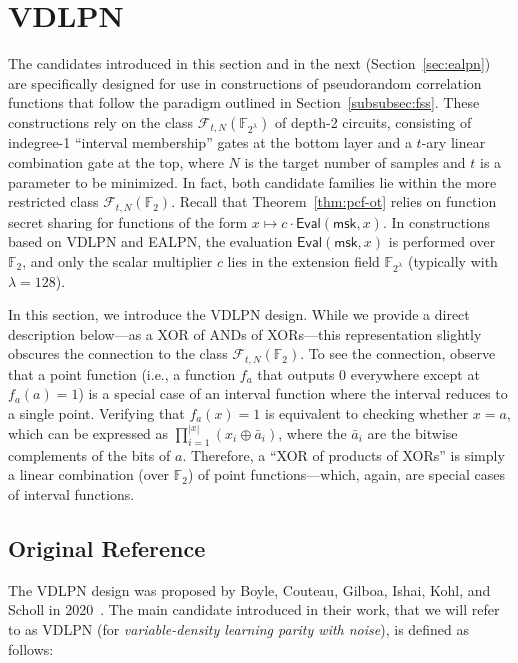\documentclass[journal=tosc,submission]{iacrtrans}
\theoremstyle{theorem}
\newcommand\setF{\ensuremath{\mathcal{F}}\xspace}
\renewcommand\secpar{\ensuremath{\lambda}\xspace}
\newcommand\msk{\ensuremath{\mathsf{msk}}\xspace}
\newcommand\Eval{\ensuremath{\mathsf{Eval}}\xspace}
\newcommand\F{\mathbb{F}}
\begin{document}
\section{VDLPN}
\label{sec:vdlpn}

The candidates introduced in this section and in the next (Section~\ref{sec:ealpn}) are specifically designed for use in constructions of pseudorandom correlation functions that follow the paradigm outlined in Section~\ref{subsubsec:fss}. These constructions rely on the class $\setF_{t,N}(\F_{2^\secpar})$ of depth-2 circuits, consisting of indegree-1 ``interval membership'' gates at the bottom layer and a $t$-ary linear combination gate at the top, where $N$ is the target number of samples and $t$ is a parameter to be minimized. In fact, both candidate families lie within the more restricted class $\setF_{t,N}(\F_2)$. Recall that Theorem~\ref{thm:pcf-ot} relies on function secret sharing for functions of the form $x \mapsto c \cdot \Eval(\msk,x)$. In constructions based on {\sf VDLPN} and {\sf EALPN}, the evaluation $\Eval(\msk,x)$ is performed over $\F_2$, and only the scalar multiplier $c$ lies in the extension field $\F_{2^\secpar}$ (typically with $\secpar = 128$).

In this section, we introduce the {\sf VDLPN} design. While we provide a direct description below—as a XOR of ANDs of XORs—this representation slightly obscures the connection to the class $\setF_{t,N}(\F_{2})$. To see the connection, observe that a point function (i.e., a function $f_a$ that outputs $0$ everywhere except at $f_a(a) = 1$) is a special case of an interval function where the interval reduces to a single point. Verifying that $f_a(x) = 1$ is equivalent to checking whether $x = a$, which can be expressed as $\prod_{i=1}^{|x|} (x_i \oplus \bar{a}_i)$, where the $\bar{a}_i$ are the bitwise complements of the bits of $a$. Therefore, a “XOR of products of XORs” is simply a linear combination (over $\F_2$) of point functions—which, again, are special cases of interval functions.


\subsection{Original Reference}

The {\sf VDLPN} design was proposed by Boyle, Couteau, Gilboa, Ishai, Kohl, and Scholl in 2020~\cite{vdlpn}. The main candidate introduced in their work, that we will refer to as {\sf VDLPN} (for \emph{variable-density learning parity with noise}), is defined as follows:
\end{document}
